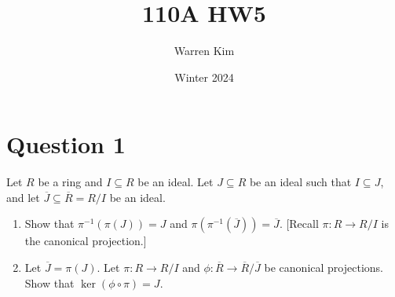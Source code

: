 \documentclass [12pt] {article}
\title{110A HW5}
\author{Warren Kim}
\date{Winter 2024}
\begin{document}
\maketitle

\section*{Question 1}
Let $R$ be a ring and $I\subseteq R$ be an ideal. Let $J\subseteq R$ be an ideal such that
    $I\subseteq J$, and let $\overline{J}\subseteq \overline{R}=R/I$ be an ideal. 

\begin{enumerate}
    \item Show that $\pi^{-1}(\pi(J))=J$ and $\pi(\pi^{-1}(\overline{J}))=\overline{J}$. [Recall $\pi:R\to R/I$ is the canonical projection.]

    \item Let $\overline{J}=\pi(J)$. Let $\pi:R\to R/I$ and $\phi:\overline{R}\to \overline{R}/\overline{J}$ be canonical projections. 
    Show that $\ker(\phi\circ\pi)=J$. 
\end{enumerate}
\end{document}
